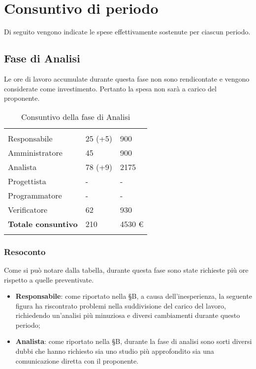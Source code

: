 \section{Consuntivo di periodo}

Di seguito vengono indicate le spese effettivamente sostenute per ciascun periodo.

\subsection{Fase di Analisi}

Le ore di lavoro accumulate durante questa fase non sono rendicontate e vengono considerate come investimento. Pertanto la spesa non sarà a carico del proponente.

\begin{longtable}{ C{4cm} C{3cm} C{3.5cm}} 
 	 &
 	 &
 	 \\
 	
 	Responsabile & 25 (+5) & 900\\
 	Amministratore & 45 & 900\\
 	Analista & 78 (+9) & 2175\\
 	Progettista & - & -\\
 	Programmatore & - & -\\
 	Verificatore & 62 & 930\\
 	
	\hline 	
 	
 	\textbf{Totale consuntivo} &
	210  &
 	4530 € \\	
 	
 	\caption{Consuntivo della fase di Analisi}
\end{longtable}

\vspace{-1cm}

\subsubsection{Resoconto}
Come si può notare dalla tabella, durante questa fase sono state richieste più ore rispetto a quelle preventivate.
\begin{itemize}
\item \textbf{Responsabile}: come riportato nella \S B, a causa dell'inesperienza, la seguente figura ha riscontrato problemi nella suddivisione del carico del lavoro, richiedendo un'analisi più minuziosa e diversi cambiamenti durante questo periodo;
\item \textbf{Analista}: come riportato nella \S B, durante la fase di analisi sono sorti diversi dubbi che hanno richiesto sia uno studio più approfondito sia una comunicazione diretta con il proponente.
\end{itemize}
